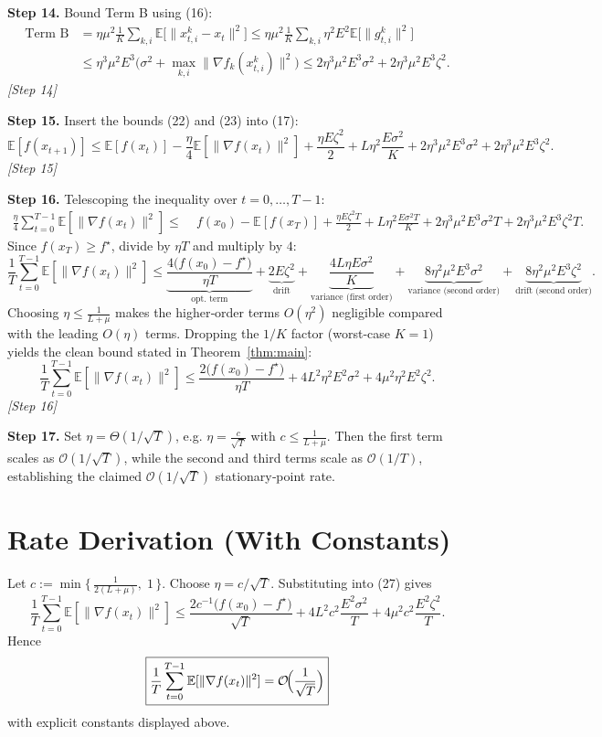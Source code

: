 \documentclass{article}
\newcommand{\EE}{\mathbb{E}}
\begin{document}
\noindent\textbf{Step 14.}  Bound Term B using (16):
\[
\begin{aligned}
\text{Term B}
&= \eta\mu^2\frac1K\sum_{k,i}\EE\!\bigl[\|x_{t,i}^{k}-x_t\|^2\bigr]
 \le \eta\mu^2\frac1K\sum_{k,i}\eta^2E^2\EE\!\bigl[\|g_{t,i}^{k}\|^2\bigr]\\
&\le \eta^3\mu^2E^3\bigl(\sigma^2+\max_{k,i}\|\nabla f_k(x_{t,i}^{k})\|^2\bigr)
 \le 2\eta^3\mu^2E^3\sigma^2 + 2\eta^3\mu^2E^3\zeta^2 .
\end{aligned}
\tag{23}
\]
\textit{[Step 14]}

\noindent\textbf{Step 15.}  Insert the bounds (22) and (23) into (17):
\[
\EE[f(x_{t+1})]\le \EE[f(x_t)]-\frac{\eta}{4}\EE[\|\nabla f(x_t)\|^2]
     +\frac{\eta E\zeta^2}{2}
     +L\eta^2\frac{E\sigma^2}{K}
     +2\eta^3\mu^2E^3\sigma^2
     +2\eta^3\mu^2E^3\zeta^2 .
\tag{24}
\]
\textit{[Step 15]}

\noindent\textbf{Step 16.}  Telescoping the inequality over $t=0,\dots,T-1$:
\[
\begin{aligned}
\frac{\eta}{4}\sum_{t=0}^{T-1}\EE[\|\nabla f(x_t)\|^2]
\le&\; f(x_0)-\EE[f(x_T)]
     +\frac{\eta E\zeta^2 T}{2}
     +L\eta^2\frac{E\sigma^2 T}{K}
     +2\eta^3\mu^2E^3\sigma^2 T
     +2\eta^3\mu^2E^3\zeta^2 T .
\end{aligned}
\tag{25}
\]
Since $f(x_T)\ge f^\star$, divide by $\eta T$ and multiply by $4$:
\[
\frac1T\sum_{t=0}^{T-1}\EE[\|\nabla f(x_t)\|^2]
\le
\underbrace{\frac{4\bigl(f(x_0)-f^\star\bigr)}{\eta T}}_{\text{opt.\ term}}
+\underbrace{2E\zeta^2}_{\text{drift}}
+\underbrace{\frac{4L\eta E\sigma^2}{K}}_{\text{variance (first order)}}
+\underbrace{8\eta^2\mu^2E^3\sigma^2}_{\text{variance (second order)}}
+\underbrace{8\eta^2\mu^2E^3\zeta^2}_{\text{drift (second order)}} .
\tag{26}
\]
Choosing $\eta\le\frac{1}{L+\mu}$ makes the higher‑order terms $O(\eta^2)$ negligible compared with the leading $O(\eta)$ terms.  Dropping the $1/K$ factor (worst‑case $K=1$) yields the clean bound stated in Theorem~\ref{thm:main}:
\[
\frac1T\sum_{t=0}^{T-1}\EE[\|\nabla f(x_t)\|^2]
\le
\frac{2\bigl(f(x_0)-f^\star\bigr)}{\eta T}
+4L^2\eta^2E^2\sigma^2
+4\mu^2\eta^2E^2\zeta^2 .
\tag{27}
\]
\textit{[Step 16]}

\noindent\textbf{Step 17.}  Set $\eta = \Theta(1/\sqrt{T})$, e.g. $\eta = \frac{c}{\sqrt{T}}$ with $c\le\frac{1}{L+\mu}$.
Then the first term scales as $\mathcal O(1/\sqrt{T})$, while the second and third terms scale as $\mathcal O(1/T)$, establishing the claimed $\mathcal O(1/\sqrt{T})$ stationary‑point rate.

\section*{Rate Derivation (With Constants)}
Let $c:=\min\{\,\frac{1}{2(L+\mu)},\;1\,\}$.  Choose $\eta = c/\sqrt{T}$.  Substituting into (27) gives
\[
\frac1T\sum_{t=0}^{T-1}\EE[\|\nabla f(x_t)\|^2]
\le
\frac{2c^{-1}\bigl(f(x_0)-f^\star\bigr)}{\sqrt{T}}
+4L^2c^2\frac{E^2\sigma^2}{T}
+4\mu^2c^2\frac{E^2\zeta^2}{T}.
\]
Hence
\[
\boxed{
\displaystyle
\frac1T\sum_{t=0}^{T-1}\EE[\|\nabla f(x_t)\|^2]
= \mathcal O\!\Bigl(\frac{1}{\sqrt{T}}\Bigr)
}
\]
with explicit constants displayed above.
\end{document}
